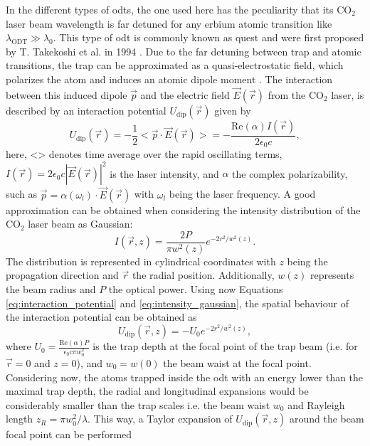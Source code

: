 In the different types of \acp{odt}, the one used here has the peculiarity that its $\text{CO}_2$ laser beam wavelength is far detuned for any erbium atomic transition like $\lambda_\text{ODT} \gg \lambda_0$. This type of \ac{odt} is commonly known as \Acf{quest} and were first proposed by T. Takekoshi et al. in 1994 \cite{Takekoshi1995}. Due to the far detuning between trap and atomic transitions, the trap can be approximated as a quasi-electrostatic field, which polarizes the atom and induces an atomic dipole moment \cite{Grimm2000}. The interaction between this induced dipole $\vec{p}$ and the electric field $\vec{E}(\vec{r})$ from the $\text{CO}_2$ laser, is described by an interaction potential $U_{\text{dip}}(\vec{r})$ given by
\begin{equation}\label{eq:interaction_potential}
	U_{\text{dip}}(\vec{r}) = -\frac{1}{2} <\vec{p} \cdot \vec{E}(\vec{r})>=-\frac{\text{Re}(\alpha) I(\vec{r})}{2 \epsilon_0 c},
\end{equation}
here, <> denotes time average over the rapid oscillating terms, $I(\vec{r}) = 2 \epsilon_0 c |\vec{E}(\vec{r})|^2$ is the laser intensity, and $\alpha$ the complex polarizability, such as $\vec{p} = \alpha(\omega_l) \cdot \vec{E}(\vec{r})$ with $\omega_l$ being the laser frequency. A good approximation can be obtained when considering the intensity distribution of the $\text{CO}_2$ laser beam as Gaussian:
\begin{equation}\label{eq:intensity_gaussian}
	I(\vec{r}, z) = \frac{2P}{\pi w^2(z)} e^{-2r^2/w^2(z)}.
\end{equation}
The distribution is represented in cylindrical coordinates with $z$ being the propagation direction and $\vec{r}$ the radial position. Additionally, $w(z)$ represents the beam radius and $P$ the optical power. Using now Equations \eqref{eq:interaction_potential} and \eqref{eq:intensity_gaussian}, the spatial behaviour of the interaction potential can be obtained as
\begin{equation}\label{eq:dipole_potential}
	U_{\text{dip}}(\vec{r}, z) =  -U_0 e^{-2r^2/w^2(z)},
\end{equation}
where $U_0 = \frac{\text{Re}(\alpha) P}{\epsilon_0 c \pi w_0^2}$ is the trap depth at the focal point of the trap beam (i.e. for $\vec{r} = 0$ and $z=0$), and $w_0=w(0)$ the beam waist at the focal point. Considering now, the atoms trapped inside the \ac{odt} with an energy lower than the maximal trap depth, the radial and longitudinal expansions would be considerably smaller than the trap scales i.e. the beam waist $w_0$ and Rayleigh length $z_R = \pi w_0^2/ \lambda$. This way, a Taylor expansion of $U_{\text{dip}}(\vec{r}, z)$  around the beam focal point can be performed
